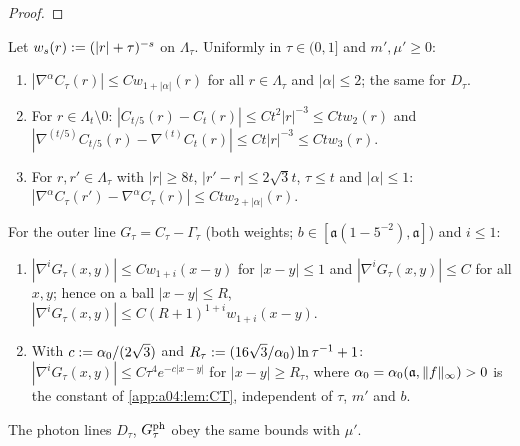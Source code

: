 \begin{proof}
\end{proof}

\begin{lemma}\label{app:a04:lem:TIOUT}
Let $w_s(r):=(|r|+\tau)^{-s}$ on $\Lambda_\tau$. Uniformly in $\tau\in(0,1]$ and $m',\mu'\ge0$:
\begin{enumerate}[label=\textup{(T\arabic*)},leftmargin=*]
\item $|\nabla^\alpha C_\tau(r)|\le Cw_{1+|\alpha|}(r)$ for all $r\in\Lambda_\tau$ and $|\alpha|\le2$; the same for $D_\tau$.
\item For $r\in\Lambda_t\setminus0$: $|C_{t/5}(r)-C_t(r)|\le Ct^2|r|^{-3}\le Ctw_2(r)$ and $|\nabla^{(t/5)}C_{t/5}(r)-\nabla^{(t)}C_t(r)|\le Ct|r|^{-3}\le Ctw_3(r)$.
\item For $r,r'\in\Lambda_\tau$ with $|r|\ge8t$, $|r'-r|\le2\sqrt3t$, $\tau\le t$ and $|\alpha|\le1$: $|\nabla^\alpha C_\tau(r')-\nabla^\alpha C_\tau(r)|\le Ctw_{2+|\alpha|}(r)$.
\end{enumerate}
For the outer line $G_\tau=C_\tau-\Gamma_\tau$ (both weights; $b\in[\mathfrak a(1-5^{-2}),\mathfrak a]$) and $i\le1$:
\begin{enumerate}[label=\textup{(O\arabic*)},leftmargin=*]
\item $|\nabla^iG_\tau(x,y)|\le Cw_{1+i}(x-y)$ for $|x-y|\le1$ and $|\nabla^iG_\tau(x,y)|\le C$ for all $x,y$; hence on a ball $|x-y|\le R$, $|\nabla^iG_\tau(x,y)|\le C(R+1)^{1+i}w_{1+i}(x-y)$.
\item With $c:=\alpha_0/(2\sqrt3)$ and $R_\tau:=(16\sqrt3/\alpha_0)\ln\tau^{-1}+1$: $|\nabla^iG_\tau(x,y)|\le C\tau^4e^{-c|x-y|}$ for $|x-y|\ge R_\tau$, where $\alpha_0=\alpha_0(\mathfrak a,\lVert f\rVert_\infty)>0$ is the constant of \cref{app:a04:lem:CT}, independent of $\tau$, $m'$ and $b$.
\end{enumerate}
The photon lines $D_\tau$, $G^{\mathrm{ph}}_\tau$ obey the same bounds with $\mu'$.
\end{lemma}
